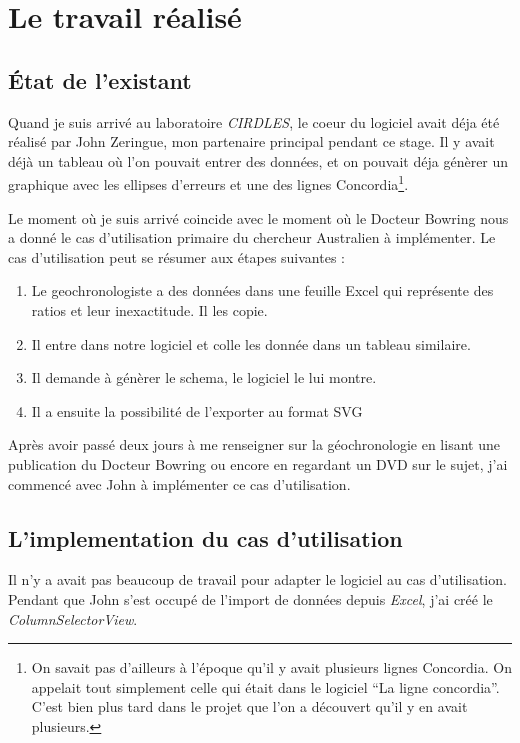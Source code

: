 \chapter{Le travail réalisé}
\section{État de l'existant}
Quand je suis arrivé au laboratoire \textit{CIRDLES}, le coeur du logiciel avait déja été réalisé par John Zeringue, mon partenaire principal pendant ce stage. Il y avait déjà un tableau où l'on pouvait entrer des données, et on pouvait déja génèrer un graphique avec les ellipses d'erreurs et une des lignes Concordia\footnote{On savait pas d'ailleurs à l'époque qu'il y avait plusieurs lignes Concordia. On appelait tout simplement celle qui était dans le logiciel ``La ligne concordia''. C'est bien plus tard dans le projet que l'on a découvert qu'il y en avait plusieurs.}.

Le moment où je suis arrivé coincide avec le moment où le Docteur Bowring nous a donné le cas d'utilisation primaire du chercheur Australien à implémenter. Le cas d'utilisation peut se résumer aux étapes suivantes :
\begin{enumerate}
\item Le geochronologiste a des données dans une feuille Excel qui représente des ratios et leur inexactitude. Il les copie.
\item Il entre dans notre logiciel et colle les donnée dans un tableau similaire.
\item Il demande à génèrer le schema, le logiciel le lui montre.
\item Il a ensuite la possibilité de l'exporter au format SVG
\end{enumerate}

Après avoir passé deux jours à me renseigner sur la géochronologie en lisant une publication du Docteur Bowring ou encore en regardant un DVD sur le sujet, %
j'ai commencé avec John à implémenter ce cas d'utilisation.

\section{L'implementation du cas d'utilisation}
Il n'y a avait pas beaucoup de travail pour adapter le logiciel au cas d'utilisation. Pendant que John s'est occupé de l'import de données depuis \textit{Excel}, j'ai créé le \textit{ColumnSelectorView}.
